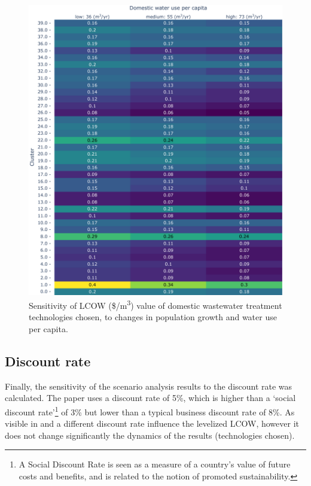 \documentclass[12pt]{iopart}
\begin{document}
\begin{figure}[!h]
	\centering
	\includegraphics[width=\textwidth]{PopSensitivityLCOWCluster}
	\caption{Sensitivity of LCOW (\$/m\textsuperscript{3}) value of domestic wastewater treatment technologies chosen, to changes in population growth and water use per capita.}
	\label{fig:popasenslcowcluster}
\end{figure}

\clearpage
\subsection{Discount rate}
Finally, the sensitivity of the scenario analysis results to the discount rate was calculated. The paper uses a discount rate of 5\%, which is higher than a ‘social discount rate’\footnote{A Social Discount Rate is seen as a measure of a country’s value of future costs and benefits, and is related to the notion of promoted sustainability.} of 3\% but lower than a typical business discount rate of 8\%. As visible in  and  a different discount rate influence the levelized LCOW, however it does not change significantly the dynamics of the results (technologies chosen).
\end{document}
